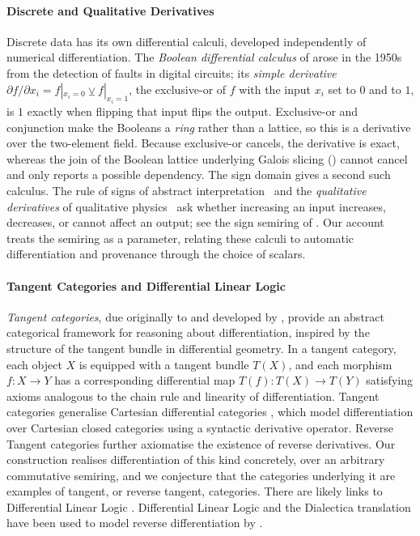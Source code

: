 \paragraph{Discrete and Qualitative Derivatives}

Discrete data has its own differential calculi, developed independently of numerical differentiation.
The \emph{Boolean differential calculus} of \citet{steinbach17} arose in the 1950s from the detection of
faults in digital circuits; its \emph{simple derivative} $\partial f / \partial x_i = f|_{x_i = 0} \veebar
f|_{x_i = 1}$, the exclusive-or of $f$ with the input $x_i$ set to $0$ and to $1$, is $1$ exactly when
flipping that input flips the output. Exclusive-or and conjunction make the Booleans a \emph{ring} rather than
a lattice, so this is a derivative over the two-element field. Because exclusive-or cancels, the derivative is
exact, whereas the join of the Boolean lattice underlying Galois slicing
() cannot cancel and only reports a possible dependency. The sign domain
gives a second such calculus. The rule of signs of
abstract interpretation~\cite{cousot77} and the \emph{qualitative derivatives} of qualitative
physics~\cite{dekleer84,kuipers86} ask whether increasing an input increases, decreases, or cannot affect an
output; see the sign semiring of . Our account treats the semiring as a
parameter, relating these calculi to automatic differentiation and provenance through the choice of
scalars.

\paragraph{Tangent Categories and Differential Linear Logic}

\emph{Tangent categories}, due originally to \citet{rosický84} and developed by \citet{cockett14,cockett18},
provide an abstract categorical framework for reasoning about differentiation, inspired by the structure of
the tangent bundle in differential geometry. In a tangent category, each object $X$ is equipped with a tangent
bundle $T(X)$, and each morphism $f: X \to Y$ has a corresponding differential map $T(f): T(X) \to T(Y)$
satisfying axioms analogous to the chain rule and linearity of differentiation. Tangent categories generalise
Cartesian differential categories \cite{cdcs}, which model differentiation over Cartesian closed categories
using a syntactic derivative operator. Reverse Tangent categories \cite{reverse-tangents} further axiomatise
the existence of reverse derivatives. Our construction realises differentiation of this kind concretely, over an arbitrary commutative
semiring, and we conjecture that the categories underlying it are examples of tangent, or reverse tangent,
categories. There are likely links to Differential Linear Logic
\cite{ehrhard_differential_2006}. Differential Linear Logic and the Dialectica translation have been used to
model reverse differentiation by \citet{kerjean-pedrot2024}.
